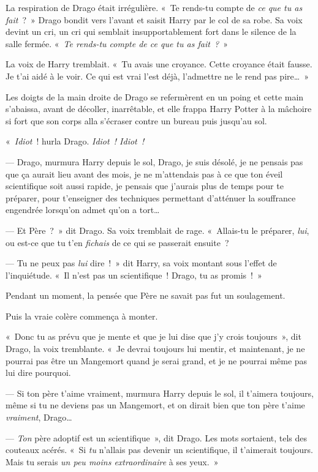 La respiration de Drago était irrégulière. «~Te rends-tu compte de \emph{ce que tu as fait}~?~» Drago bondit vers l'avant et saisit Harry par le col de sa robe. Sa voix devint un cri, un cri qui semblait insupportablement fort dans le silence de la salle fermée. «~\emph{Te rends-tu compte de ce que tu as fait~?}~»

La voix de Harry tremblait. «~Tu avais une croyance. Cette croyance était fausse. Je t'ai aidé à le voir. Ce qui est vrai l'est déjà, l'admettre ne le rend pas pire…~»

Les doigts de la main droite de Drago se refermèrent en un poing et cette main s'abaissa, avant de décoller, inarrêtable, et elle frappa Harry Potter à la mâchoire si fort que son corps alla s'écraser contre un bureau puis jusqu'au sol.

«~\emph{Idiot}~! hurla Drago. \emph{Idiot~! Idiot~!}

--- Drago, murmura Harry depuis le sol, Drago, je suis désolé, je ne pensais pas que ça aurait lieu avant des mois, je ne m'attendais pas à ce que ton éveil scientifique soit aussi rapide, je pensais que j'aurais plus de temps pour te préparer, pour t'enseigner des techniques permettant d'atténuer la souffrance engendrée lorsqu'on admet qu'on a tort…

--- Et Père~?~» dit Drago. Sa voix tremblait de rage. «~Allais-tu le préparer, \emph{lui}, ou est-ce que tu t'en \emph{fichais} de ce qui se passerait ensuite~?

--- Tu ne peux pas \emph{lui} dire~!~» dit Harry, sa voix montant sous l'effet de l'inquiétude. «~Il n'est pas un scientifique~! Drago, tu as promis~!~»

Pendant un moment, la pensée que Père ne savait pas fut un soulagement.

Puis la vraie colère commença à monter.

«~Donc tu as prévu que je mente et que je lui dise que j'y crois toujours~», dit Drago, la voix tremblante. «~Je devrai toujours lui mentir, et maintenant, je ne pourrai pas être un Mangemort quand je serai grand, et je ne pourrai même pas lui dire pourquoi.

--- Si ton père t'aime vraiment, murmura Harry depuis le sol, il t'aimera toujours, même si tu ne deviens pas un Mangemort, et on dirait bien que ton père t'aime \emph{vraiment}, Drago…

--- \emph{Ton} père adoptif est un scientifique~», dit Drago. Les mots sortaient, tels des couteaux acérés. «~Si \emph{tu} n'allais pas devenir un scientifique, il t'aimerait toujours. Mais tu serais \emph{un peu moins extraordinaire} à ses yeux.~»

